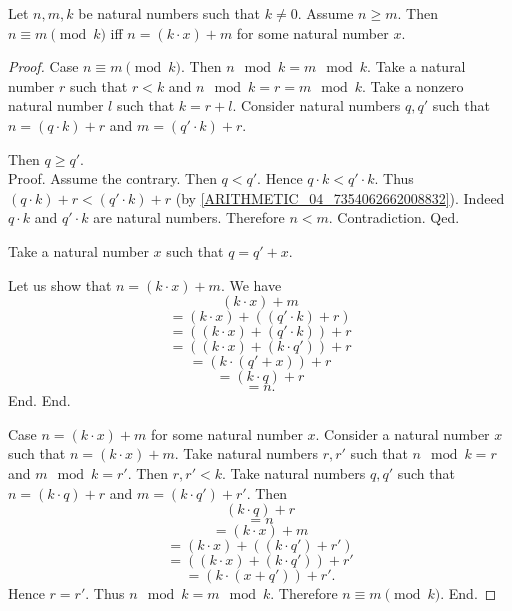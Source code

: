 \documentclass[10pt]{article}
\begin{document}
  \begin{forthel}
    \begin{proposition}
      Let $n, m, k$ be natural numbers such that $k \neq 0$.
      Assume $n \geq m$.
      Then $n \equiv m \pmod{k}$ iff $n = (k \cdot x) + m$ for some natural
      number $x$.
    \end{proposition}
    \begin{proof}
      Case $n \equiv m \pmod{k}$.
        Then $n \mod k = m \mod k$.
        Take a natural number $r$ such that $r < k$ and
        $n \mod k = r = m \mod k$.
        Take a nonzero natural number $l$ such that $k = r + l$.
        Consider natural numbers $q,q'$ such that $n = (q \cdot k) + r$ and
        $m = (q' \cdot k) + r$.

        Then $q \geq q'$. \\
        Proof.
          Assume the contrary.
          Then $q < q'$.
          Hence $q \cdot k < q' \cdot k$.
          Thus $(q \cdot k) + r < (q' \cdot k) + r$
          (by \cref{ARITHMETIC_04_7354062662008832}).
          Indeed $q \cdot k$ and $q' \cdot k$ are natural numbers.
          Therefore $n < m$.
          Contradiction.
        Qed.

        Take a natural number $x$ such that $q = q' + x$.

        Let us show that $n = (k \cdot x) + m$.
          We have
          \[  (k \cdot x) + m                       \]
          \[    = (k \cdot x) + ((q' \cdot k) + r)  \]
          \[    = ((k \cdot x) + (q' \cdot k)) + r  \]
          \[    = ((k \cdot x) + (k \cdot q')) + r  \]
          \[    = (k \cdot (q' + x)) + r            \]
          \[    = (k \cdot q) + r                   \]
          \[    = n.                                \]
        End.
      End.

      Case $n = (k \cdot x) + m$ for some natural number $x$.
        Consider a natural number $x$ such that $n = (k \cdot x) + m$.
        Take natural numbers $r, r'$ such that $n \mod k = r$ and
        $m \mod k = r'$.
        Then $r, r' < k$.
        Take natural numbers $q, q'$ such that $n = (k \cdot q) + r$ and
        $m = (k \cdot q') + r'$.
        Then
        \[  (k \cdot q) + r                         \]
        \[    = n                                   \]
        \[    = (k \cdot x) + m                     \]
        \[    = (k \cdot x) + ((k \cdot q') + r')   \]
        \[    = ((k \cdot x) + (k \cdot q')) + r'   \]
        \[    = (k \cdot (x + q')) + r'.            \]
        Hence $r = r'$.
        Thus $n \mod k = m \mod k$.
        Therefore $n \equiv m \pmod{k}$.
      End.
    \end{proof}
  \end{forthel}
\end{document}
